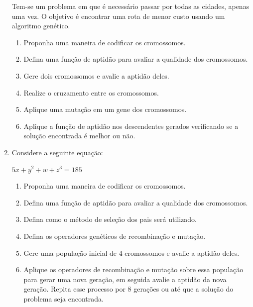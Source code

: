 \documentclass[12pt,a4paper,oneside]{article}
\begin{document}
\begin{enumerate}
	Tem-se um problema em que é necessário passar por todas as cidades, apenas uma vez. O objetivo é encontrar uma rota de menor custo usando um algoritmo genético.
	
	\begin{enumerate}
		\item Proponha uma maneira de codificar os cromossomos.
		\item Defina uma função de aptidão para avaliar a qualidade dos cromossomos.
		\item Gere dois cromossomos e avalie a aptidão deles.
		\item Realize o cruzamento entre os cromossomos.
		\item Aplique uma mutação em um gene dos cromossomos.
		\item Aplique a função de aptidão nos descendentes gerados verificando se a solução encontrada é melhor ou não.
	\end{enumerate}
	
	\newpage
	
	\item Considere a seguinte equação:
	\begin{center}
		$5x + y^2 + w + z^3 = 185$
	\end{center}
	\begin{enumerate}
		\item Proponha uma maneira de codificar os cromossomos.
		\item Defina uma função de aptidão para avaliar a qualidade dos cromossomos.
		\item Defina como o método de seleção dos pais será utilizado.
		\item Defina os operadores genéticos de recombinação e mutação.
		\item Gere uma população inicial de 4 cromossomos e avalie a aptidão deles.
		\item Aplique os operadores de recombinação e mutação sobre essa população para gerar uma nova geração, em seguida avalie a aptidão da nova geração. Repita esse processo por 8 gerações ou até que a solução do problema seja encontrada.
	\end{enumerate}
	
\end{enumerate}
\end{document}
